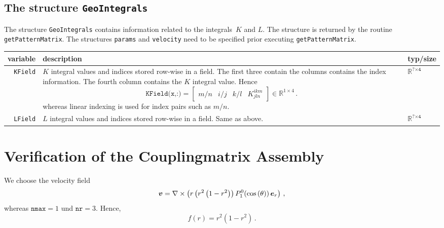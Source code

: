 \subsection{The structure \texttt{GeoIntegrals}}
The structure \texttt{GeoIntegrals} contains information related to the integrals~$K$ and $L$. The structure 
is returned by the routine \texttt{getPatternMatrix}. The structures \texttt{params} and \texttt{velocity} 
need to be specified prior executing \texttt{getPatternMatrix}.
\begin{center}
\begin{tabularx}{\textwidth}{rXl}
	variable & description & typ/size\\\hline
	\texttt{KField} & $K$ integral values and indices stored row-wise in a field. The first three contain the columns contains the index information. The fourth column contains the $K$ integral value. Hence
	\begin{equation*}
		\texttt{KField(x,:)}=
		\begin{bmatrix}
			m/n & i/j & k/l & K^{ikm}_{jln}
		\end{bmatrix}\in\mathbb{R}^{1\times4}\,.
	\end{equation*}
	whereas linear indexing is used for index pairs such as $m/n$.
  & $\mathbb{R}^{\texttt{?}\times\texttt{4}}$\\
	\texttt{LField} & $L$ integral values and indices stored row-wise in a field. Same as above. & 
	$\mathbb{R}^{\texttt{?}\times\texttt{4}}$
\end{tabularx}
\end{center}

\section{Verification of the Couplingmatrix Assembly}
We choose the velocity field
\begin{equation}
	\bm{v}=\nabla\times\left(r\left(r^2\left(1-r^2\right)\right)
	\alegend[\co{\theta}]{1}{0}\er\right)\,,
\end{equation}
whereas $\texttt{nmax}=1$ und $\texttt{nr}=3$. Hence,
\begin{equation}
	f\left(r\right)=r^2\left(1-r^2\right)\,.
\end{equation}
